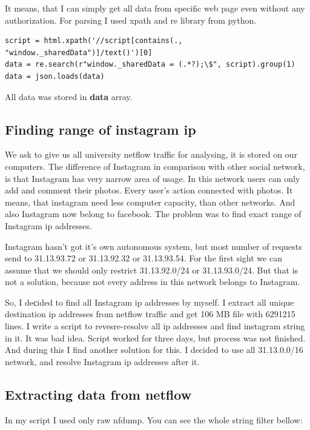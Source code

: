 It means, that I can simply get all data from specific web page even without any authorization. For parsing I used xpath and re library from python. 

\begin{lstlisting}
script = html.xpath('//script[contains(., "window._sharedData")]/text()')[0]
data = re.search(r"window._sharedData = (.*?);\$", script).group(1)
data = json.loads(data)
\end{lstlisting}

All data was stored in \textbf{data} array.

\subsection{Finding range of instagram ip}

We ask to give us all university netflow traffic for analysing, it is stored on our computers. The difference of Instagram in comparison with other social network, is that Instagram has very narrow area of usage. In this network users can only add and comment their photos. Every user’s action connected with photos. It means, that instagram need less computer capacity, than other networks. And also Instagram now belong to facebook. The problem was to find exact range of Instagram ip addresses. 

Instagram hasn’t got it’s own autonomous system, but most number of requests send to 31.13.93.72 or 31.13.92.32 or 31.13.93.54. For the first sight we can assume that we should only restrict 31.13.92.0/24 or 31.13.93.0/24. But that is not a solution, because not every address in this network belongs to Instagram.

So, I deсided to find all Instagram ip addresses by myself. I extract all unique destination ip addresses from netflow traffic and get 106 MB file with 6291215 lines. I write a script to revesre-resolve all ip addresses and find instagram string in it. It was bad idea. Script worked for three days, but process was not finished. And during this I find another solution for this. I decided to use all 31.13.0.0/16 network, and resolve Instagram ip addresses after it.

\subsection{Extracting data from netflow}

In my script I used only raw nfdump. You can see the whole string filter bellow:

